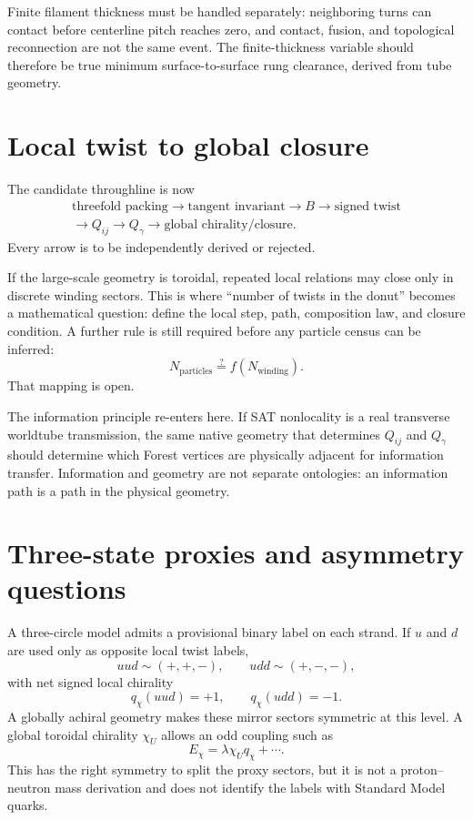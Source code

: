 \documentclass[11pt]{article}
\begin{document}
Finite filament thickness must be handled separately: neighboring turns can contact before centerline pitch reaches zero, and contact, fusion, and topological reconnection are not the same event. The finite-thickness variable should therefore be true minimum surface-to-surface rung clearance, derived from tube geometry.

\section{Local twist to global closure}

The candidate throughline is now
\begin{equation}
\boxed{\begin{gathered}
\text{threefold packing}\to\text{tangent invariant}\to B\to\text{signed twist}\\
\to Q_{ij}\to Q_\gamma\to\text{global chirality/closure}.
\end{gathered}}
\end{equation}
Every arrow is to be independently derived or rejected.

If the large-scale geometry is toroidal, repeated local relations may close only in discrete winding sectors. This is where ``number of twists in the donut'' becomes a mathematical question: define the local step, path, composition law, and closure condition. A further rule is still required before any particle census can be inferred:
\begin{equation}
N_{\mathrm{particles}}\stackrel{?}{=}f(N_{\mathrm{winding}}).
\end{equation}
That mapping is open.

The information principle re-enters here. If SAT nonlocality is a real transverse worldtube transmission, the same native geometry that determines $Q_{ij}$ and $Q_\gamma$ should determine which Forest vertices are physically adjacent for information transfer. Information and geometry are not separate ontologies: an information path is a path in the physical geometry.

\section{Three-state proxies and asymmetry questions}

A three-circle model admits a provisional binary label on each strand. If $u$ and $d$ are used only as opposite local twist labels,
\begin{equation}
uud\sim(+,+,-),\qquad udd\sim(+,-,-),
\end{equation}
with net signed local chirality
\begin{equation}
q_\chi(uud)=+1,\qquad q_\chi(udd)=-1.
\end{equation}
A globally achiral geometry makes these mirror sectors symmetric at this level. A global toroidal chirality $\chi_U$ allows an odd coupling such as
\begin{equation}
E_\chi=\lambda\chi_Uq_\chi+\cdots.
\end{equation}
This has the right symmetry to split the proxy sectors, but it is not a proton--neutron mass derivation and does not identify the labels with Standard Model quarks.
\end{document}

